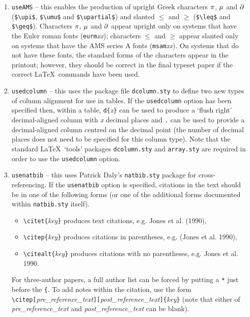 \documentclass[useAMS]{mn2e}
\begin{document}
\begin{enumerate}
\item \verb"useAMS" -- this enables the production of upright Greek
characters $\pi$, $\mu$ and $\partial$ (\verb"$\upi$",
\verb"$\umu$" and \verb"$\upartial$") and slanted $\leq$ and
$\geq$ (\verb"$\leq$" and \verb"$\geq$"). Characters $\pi$,
$\mu$ and $\partial$ appear upright only on systems that have
the Euler roman fonts (\verb"eurm"\textit{xx}); characters $\leq$
and $\geq$ appear slanted only on systems that have the AMS
series A fonts (\verb"msam"\textit{xx}). On systems that do not
have these fonts, the standard forms of the characters appear in
the printout; however, they should be correct in the final typeset
paper if the correct \LaTeX\ commands have been used.

\item \verb"usedcolumn" -- this uses the package file \verb"dcolumn.sty"
to define two new types of column alignment for use in tables. If
the \verb"usedcolumn" option has been specified then, within a
table,
 \verb"d{"\textit{x}\verb"}" can be used to produce a
`flush right' decimal-aligned column with \textit{x} decimal
places and
 \verb"." can be used to provide a decimal-aligned column centred
 on the decimal point (the number of decimal places does not need
 to be specified for this column type). Note that the standard \LaTeX\
 `tools' packages \verb"dcolumn.sty" and \verb"array.sty" are
 required in order to use the \verb"usedcolumn" option.

\item \verb"usenatbib" -- this uses Patrick Daly's \verb"natbib.sty"
package for cross-referencing. If the \verb"usenatbib" option is
specified, citations in the text should be in one of the following
forms (or one of the additional forms documented within
\verb"natbib.sty" itself).

  \begin{itemize}
  \item \verb"\citet{"\textit{key}\verb"}" produces text citations,
  e.g. Jones et al. (1990),
  \item \verb"\citep{"\textit{key}\verb"}" produces citations in parentheses,
  e.g. (Jones et al. 1990),
  \item \verb"\citealt{"\textit{key}\verb"}" produces citations with no parentheses,
  e.g. Jones et al. 1990.
  \end{itemize}
For three-author papers, a full author list can be forced by
putting a \verb"*" just before the \verb"{". To add notes within
the citation, use the form
\verb"\citep["\textit{pre\_reference\_text}\verb"]["\textit{post\_reference\_text}\verb"]{"\textit{key}\verb"}"
(note that either of \textit{pre\_reference\_text} and
\textit{post\_reference\_text} can be blank).


\end{enumerate}
\end{document}
